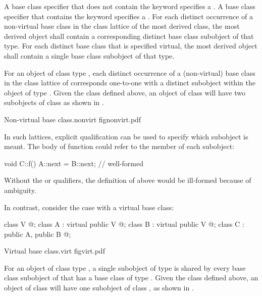 \pnum
{}%
A base class specifier that does not contain the keyword
 specifies a . A base
class specifier that contains the keyword  specifies a
. For each distinct occurrence of a
non-virtual base class in the class lattice of the most derived class,
the most derived object shall contain a
corresponding distinct base class subobject of that type. For each
distinct base class that is specified virtual, the most derived object
shall contain a single base class subobject of that type.

\pnum
\begin{note}
For an object of class type , each distinct occurrence of a
(non-virtual) base class  in the class lattice of 
corresponds one-to-one with a distinct  subobject within the
object of type . Given the class  defined above, an
object of class  will have two subobjects of class  as
shown in .

\begin{importgraphic}
{Non-virtual base}
{class.nonvirt}
{fignonvirt.pdf}
\end{importgraphic}

In such lattices, explicit qualification can be used to specify which
subobject is meant. The body of function  could refer to the
member  of each  subobject:
\begin{codeblock}
void C::f() { A::next = B::next; }      // well-formed
\end{codeblock}
Without the  or  qualifiers, the definition of
 above would be ill-formed because of
ambiguity.
\end{note}

\pnum
\begin{note}
In contrast, consider the case with a virtual base class:
\begin{codeblock}
class V { @\commentellip@ };
class A : virtual public V { @\commentellip@ };
class B : virtual public V { @\commentellip@ };
class C : public A, public B { @\commentellip@ };
\end{codeblock}
\begin{importgraphic}
{Virtual base}
{class.virt}
{figvirt.pdf}
\end{importgraphic}
For an object  of class type , a single subobject of
type  is shared by every base class subobject of  that has a
 base class of type . Given the class 
defined above, an object of class  will have one subobject of
class , as shown in .
%
%
\end{note}

